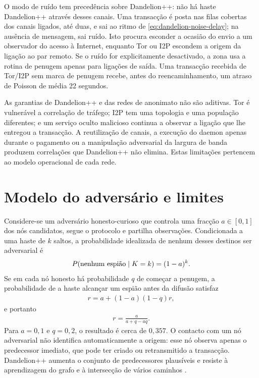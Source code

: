 O modo de ruído tem precedência sobre Dandelion++: não há haste Dandelion++
através desses canais. Uma transacção é posta nas filas cobertas dos canais
ligados, até duas, e sai ao ritmo de \eqref{eq:dandelion-noise-delay}; na
ausência de mensagem, sai ruído.
Isto procura esconder a ocasião do envio a um observador do acesso à Internet,
enquanto Tor ou I2P escondem a origem da ligação ao par remoto. Se o ruído for
explicitamente desactivado, a zona usa a rotina de penugem apenas para
ligações de saída. Uma transacção recebida de Tor/I2P sem marca de penugem
recebe, antes do reencaminhamento, um atraso de Poisson de média 22 segundos.

As garantias de Dandelion++ e das redes de anonimato não são aditivas. Tor é
vulnerável a correlação de tráfego; I2P tem uma topologia e uma população
diferentes; e um serviço oculto malicioso continua a observar a ligação que
lhe entregou a transacção. A reutilização de canais, a execução do daemon
apenas durante o pagamento ou a manipulação adversarial da largura de banda
produzem correlações que Dandelion++ não elimina. Estas limitações pertencem
ao modelo operacional de cada rede.


\section{Modelo do adversário e limites}
\label{sec:dandelion-adversaries}

Considere-se um adversário honesto-curioso que controla uma fracção
\(a\in[0,1]\) dos
nós candidatos, segue o protocolo e partilha observações. Condicionada a uma
haste de \(k\) saltos, a probabilidade idealizada de nenhum desses destinos
ser adversarial é
\begin{align}
 P(\hbox{nenhum espião}\mid K=k)=(1-a)^k.
 \label{eq:dandelion-no-spy-given-k}
\end{align}
Se em cada nó honesto há probabilidade \(q\) de começar a penugem, a
probabilidade de a haste alcançar um espião antes da difusão satisfaz
\begin{align*}
 r=a+(1-a)(1-q)r,
\end{align*}
e portanto
\begin{align}
 r=\frac{a}{a+q-aq}.
 \label{eq:dandelion-spy-before-fluff}
\end{align}
Para \(a=0{,}1\) e \(q=0{,}2\), o resultado é cerca de \(0{,}357\). O contacto
com um nó adversarial não identifica automaticamente a origem: esse nó observa
apenas o predecessor imediato, que pode ter criado ou retransmitido a
transacção. Dandelion++ aumenta o conjunto de predecessores plausíveis e
resiste à aprendizagem do grafo e à intersecção de vários caminhos
\cite{dandelion-plus-plus}.

